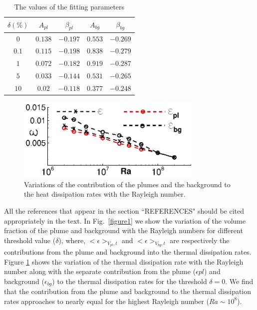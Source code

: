 \documentclass[10pt, conference]{FMFP2022}
\begin{document}
\begin{table}
\centering
\caption{The values of the fitting parameters}%
\begin{tabular}{|c|c|c|c|c|}
\hline
$\delta(\%)$   & $A_{pl}$ & $\beta_{pl}$& $A_{bg}$ &$\beta_{bg}$  \\ 
\hline
 $0$&$0.138$  &$-0.197$ &$0.553$ & $-0.269$\\
$0.1$&$0.115$  &$-0.198$ &$0.838$ &$-0.279$ \\
$1$&$0.072$  &$-0.182$ &$0.919$ &$-0.287$ \\
$5$&$0.033$  &$-0.144$ &$0.531$ &$-0.265$\\
$10$&$0.02$  &$-0.118$ &$0.377$ &$-0.248$\\
\hline
\end{tabular}
\label{table2}
\end{table}

\begin{figure}
\centering
\includegraphics[width=0.8\textwidth]{figure2.eps}
\caption{Variations of the contribution of the plumes and the background to the heat dissipation rates with the Rayleigh number.}
\label{fig:3}
\end{figure} 
All the references that appear in the section ``REFERENCES" should be cited appropriately in the text. In Fig.~\ref{figure1} we show the variation of the volume fraction of the plume and background with the Rayleigh numbers for different threshold value ($\delta$), where, $<\epsilon>_{V_{pl},t}$ and $<\epsilon>_{V_{bg},t}$ are respectively the contributions from the plume and background into the thermal dissipation rates. Figure \ref{fig:3} shows the variation of the thermal dissipation rate with the Rayleigh number along with the separate contribution from the plume ($\epsilon{pl}$) and background ($\epsilon_{bg}$) to the thermal dissipation rates for the threshold $\delta=0$. We find that the contribution from the plume and background to the thermal dissipation rates approaches to nearly equal for the highest Rayleigh number ($Ra\sim 10^8$).
\end{document}
